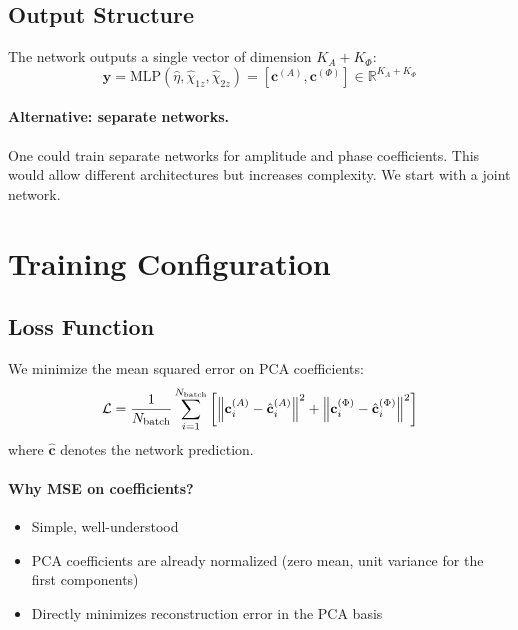 \documentclass[11pt,a4paper]{article}
\begin{document}
\subsection{Output Structure}

The network outputs a single vector of dimension $K_A + K_\Phi$:
\begin{equation}
    \mathbf{y} = \text{MLP}(\hat{\eta}, \hat{\chi}_{1z}, \hat{\chi}_{2z}) = [\mathbf{c}^{(A)}, \mathbf{c}^{(\Phi)}] \in \mathbb{R}^{K_A + K_\Phi}
\end{equation}

\paragraph{Alternative: separate networks.}
One could train separate networks for amplitude and phase coefficients. This would allow different architectures but increases complexity. We start with a joint network.

\section{Training Configuration}
\label{sec:training}

\subsection{Loss Function}

We minimize the mean squared error on PCA coefficients:
\begin{equation}
    \mathcal{L} = \frac{1}{N_{\rm batch}} \sum_{i=1}^{N_{\rm batch}} \left[ \left\| \mathbf{c}^{(A)}_i - \hat{\mathbf{c}}^{(A)}_i \right\|^2 + \left\| \mathbf{c}^{(\Phi)}_i - \hat{\mathbf{c}}^{(\Phi)}_i \right\|^2 \right]
    \label{eq:loss}
\end{equation}
where $\hat{\mathbf{c}}$ denotes the network prediction.

\paragraph{Why MSE on coefficients?}
\begin{itemize}
    \item Simple, well-understood
    \item PCA coefficients are already normalized (zero mean, unit variance for the first components)
    \item Directly minimizes reconstruction error in the PCA basis
\end{itemize}
\end{document}
